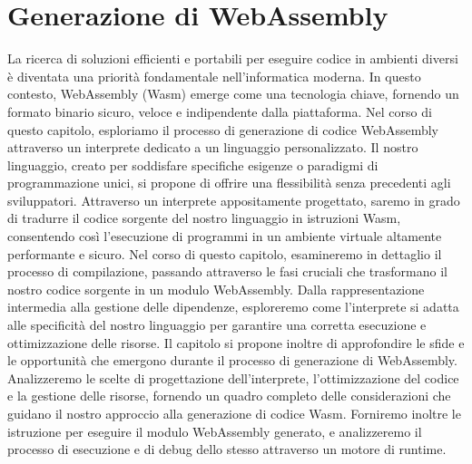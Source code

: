 \documentclass[../../main.tex]{subfiles}
\begin{document}
\chapter{Generazione di WebAssembly}
La ricerca di soluzioni efficienti e portabili per eseguire codice in ambienti diversi è diventata una priorità fondamentale nell'informatica moderna. In questo contesto, WebAssembly (Wasm) emerge come una tecnologia chiave, fornendo un formato binario sicuro, veloce e indipendente dalla piattaforma. Nel corso di questo capitolo, esploriamo il processo di generazione di codice WebAssembly attraverso un interprete dedicato a un linguaggio personalizzato.
Il nostro linguaggio, creato per soddisfare specifiche esigenze o paradigmi di programmazione unici, si propone di offrire una flessibilità senza precedenti agli sviluppatori. Attraverso un interprete appositamente progettato, saremo in grado di tradurre il codice sorgente del nostro linguaggio in istruzioni Wasm, consentendo così l'esecuzione di programmi in un ambiente virtuale altamente performante e sicuro.
Nel corso di questo capitolo, esamineremo in dettaglio il processo di compilazione, passando attraverso le fasi cruciali che trasformano il nostro codice sorgente in un modulo WebAssembly. Dalla rappresentazione intermedia alla gestione delle dipendenze, esploreremo come l'interprete si adatta alle specificità del nostro linguaggio per garantire una corretta esecuzione e ottimizzazione delle risorse.
Il capitolo si propone inoltre di approfondire le sfide e le opportunità che emergono durante il processo di generazione di WebAssembly. Analizzeremo le scelte di progettazione dell'interprete, l'ottimizzazione del codice e la gestione delle risorse, fornendo un quadro completo delle considerazioni che guidano il nostro approccio alla generazione di codice Wasm.
Forniremo inoltre le istruzione per eseguire il modulo WebAssembly generato, e analizzeremo il processo di esecuzione e di debug dello stesso attraverso un motore di runtime.
\end{document}
